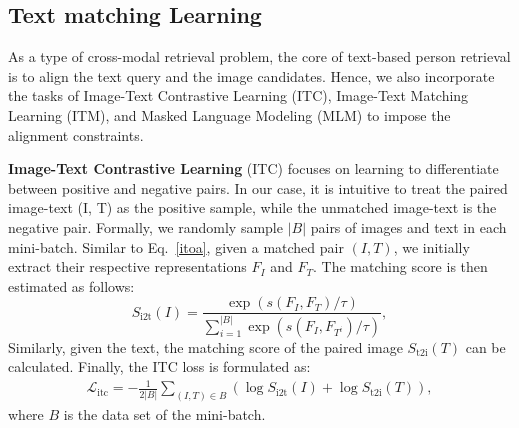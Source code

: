 \documentclass[sigconf]{acmart}
\begin{document}
\subsection{Text matching Learning} 
As a type of cross-modal retrieval problem, the core of text-based person retrieval is to align the text query and the image candidates. Hence, we also incorporate the tasks of Image-Text Contrastive Learning (ITC), Image-Text Matching Learning (ITM), and Masked Language Modeling (MLM) to impose the alignment constraints.


\noindent\textbf{Image-Text Contrastive Learning}
(ITC) focuses on learning to differentiate between positive and negative pairs. In our case, it is intuitive to treat the paired image-text (I, T) as the positive sample, while the unmatched image-text is the negative pair. 
Formally, we randomly sample $|B|$ pairs of images and text in each mini-batch. Similar to Eq.~\ref{itoa}, given a matched pair $(I, T)$, we initially extract their respective representations $F_I$ and $F_T$. The matching score is then estimated as follows:
\vspace{-.1in}
\begin{equation}
S_{\text{i2t}}(I) = \frac{\exp(s(F_I, F_T)/\tau)}{\sum_{i=1}^{|B|}\exp(s(F_I, F_{T^i})/\tau)}, \label{eq:si2t}
\end{equation}
Similarly, given the text, the matching score of the paired image  $S_{\text{t2i}}(T)$ can be calculated.
Finally, the ITC loss is formulated as:
\vspace{-.1in}
\begin{equation}
\begin{split}
\mathcal{L}_{\text{itc}} = -\frac{1}{2|B|}\sum_{(I,T)\in B}(\log S_{\text{i2t}}(I) + \log S_{\text{t2i}}(T)), \label{eq:litc}
\end{split}
\end{equation}
where $B$ is the data set of the mini-batch.
\end{document}
